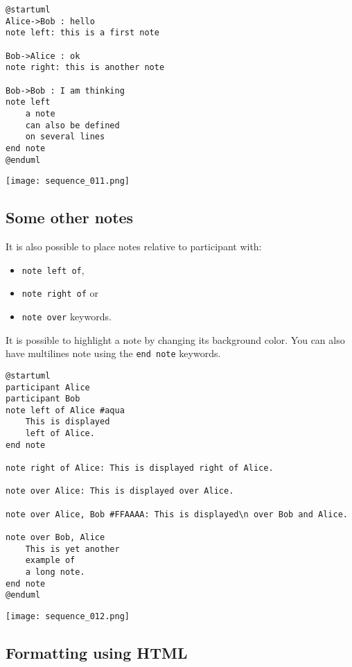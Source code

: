 \begin{lstlisting}
@startuml
Alice->Bob : hello
note left: this is a first note

Bob->Alice : ok
note right: this is another note

Bob->Bob : I am thinking
note left
	a note
	can also be defined
	on several lines
end note
@enduml
\end{lstlisting}
\begin{center}
\texttt{[image: sequence\_011.png]}
\end{center}

\newpage \subsection{Some other notes}

It is also possible to place notes relative to participant with:
\begin{itemize}
\item \texttt{note left of},
\item \texttt{note right of} or 
\item \texttt{note over} keywords.
\end{itemize}
It is possible to highlight a note by changing its background color.
You can also have multilines note using the \texttt{end note} keywords.

\begin{lstlisting}
@startuml
participant Alice
participant Bob
note left of Alice #aqua
	This is displayed 
	left of Alice. 
end note
 
note right of Alice: This is displayed right of Alice.

note over Alice: This is displayed over Alice.

note over Alice, Bob #FFAAAA: This is displayed\n over Bob and Alice.

note over Bob, Alice
	This is yet another
	example of
	a long note.
end note
@enduml
\end{lstlisting}
\begin{center}
\texttt{[image: sequence\_012.png]}
\end{center}

\newpage \subsection{Formatting using HTML}


